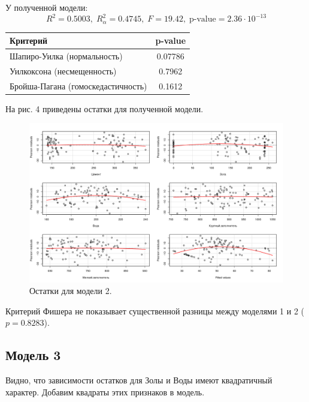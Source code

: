 \documentclass[10pt]{article}
\begin{document}
У полученной модели:
$$
  R^2 = 0.5003, \; R^2_{\alpha} = 0.4745, \; F = 19.42, \; \text{p-value} = 2.36 \cdot 10^{-13}
$$

\begin{tabularx}{\textwidth}{ |X|c| }
  \hline
  Критерий & p-value \\
  \hline
  Шапиро-Уилка (нормальность) & 0.07786 \\
  \hline
  Уилкоксона (несмещенность) & 0.7962 \\
  \hline
  Бройша-Пагана (гомоскедастичность) & 0.1612 \\
  \hline
\end{tabularx}

\bigskip

На рис. 4 приведены остатки для полученной модели.

\begin{figure}[h]
  \centering
  \includegraphics[scale=0.4]{resplots.png}
  \caption{Остатки для модели 2.}
\end{figure}

Критерий Фишера не показывает существенной разницы между моделями 1 и 2 ($p = 0.8283$).

\subsection{Модель 3}

Видно, что зависимости остатков для Золы и Воды имеют квадратичный характер.
Добавим квадраты этих признаков в модель.
\end{document}
